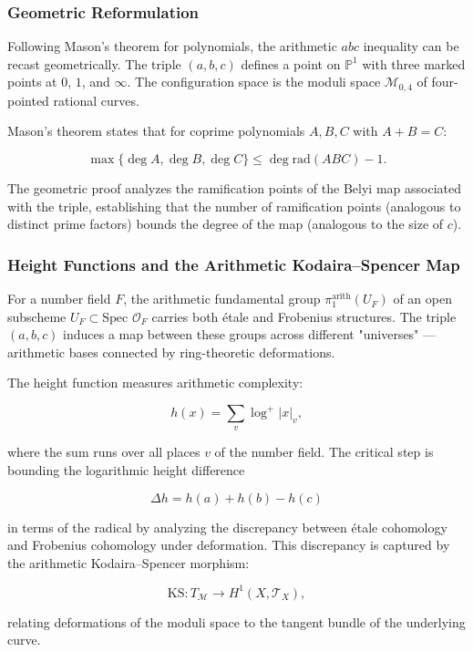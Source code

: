 \documentclass[12pt,a4paper]{article}
\begin{document}
\subsubsection{Geometric Reformulation}

Following Mason's theorem for polynomials, the arithmetic $abc$ inequality can be recast geometrically. The triple $(a, b, c)$ defines a point on $\mathbb{P}^1$ with three marked points at $0$, $1$, and $\infty$. The configuration space is the moduli space $\mathcal{M}_{0,4}$ of four-pointed rational curves.

Mason's theorem states that for coprime polynomials $A, B, C$ with $A + B = C$:

\[\max\{\deg A, \deg B, \deg C\} \leq \deg \text{rad}(ABC) - 1.\]

The geometric proof analyzes the ramification points of the Belyi map associated with the triple, establishing that the number of ramification points (analogous to distinct prime factors) bounds the degree of the map (analogous to the size of $c$).

\subsubsection{Height Functions and the Arithmetic Kodaira--Spencer Map}

For a number field $F$, the arithmetic fundamental group $\pi_1^{\text{arith}}(U_F)$ of an open subscheme $U_F \subset \text{Spec } \mathcal{O}_F$ carries both étale and Frobenius structures. The triple $(a, b, c)$ induces a map between these groups across different "universes" --- arithmetic bases connected by ring-theoretic deformations.

The height function measures arithmetic complexity:

\[h(x) = \sum_{v} \log^+ |x|_v,\]

where the sum runs over all places $v$ of the number field. The critical step is bounding the logarithmic height difference

\[\Delta h = h(a) + h(b) - h(c)\]

in terms of the radical by analyzing the discrepancy between étale cohomology and Frobenius cohomology under deformation. This discrepancy is captured by the arithmetic Kodaira--Spencer morphism:

\[\text{KS}: T_{\mathcal{M}} \to H^1(X, \mathcal{T}_X),\]

relating deformations of the moduli space to the tangent bundle of the underlying curve.
\end{document}
